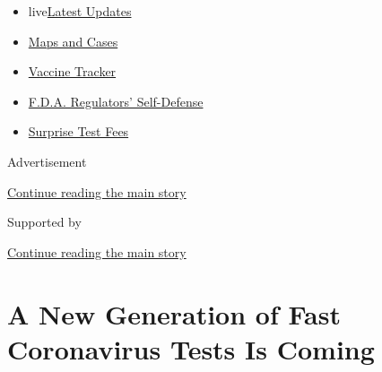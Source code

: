 \begin{itemize}
\tightlist
\item
  live\href{https://www.nytimes3xbfgragh.onion/2020/09/11/world/covid-19-coronavirus.html?name=styln-coronavirus-national\&region=TOP_BANNER\&block=storyline_menu_recirc\&action=click\&pgtype=Article\&impression_id=cadc4580-f4b6-11ea-90f6-17a6587a4d59\&variant=undefined}{Latest
  Updates}
\item
  \href{https://www.nytimes3xbfgragh.onion/interactive/2020/us/coronavirus-us-cases.html?name=styln-coronavirus-national\&region=TOP_BANNER\&block=storyline_menu_recirc\&action=click\&pgtype=Article\&impression_id=cadc4581-f4b6-11ea-90f6-17a6587a4d59\&variant=undefined}{Maps
  and Cases}
\item
  \href{https://www.nytimes3xbfgragh.onion/interactive/2020/science/coronavirus-vaccine-tracker.html?name=styln-coronavirus-national\&region=TOP_BANNER\&block=storyline_menu_recirc\&action=click\&pgtype=Article\&impression_id=cadc4582-f4b6-11ea-90f6-17a6587a4d59\&variant=undefined}{Vaccine
  Tracker}
\item
  \href{https://www.nytimes3xbfgragh.onion/2020/09/10/us/politics/fda-coronavirus-vaccine.html?name=styln-coronavirus-national\&region=TOP_BANNER\&block=storyline_menu_recirc\&action=click\&pgtype=Article\&impression_id=cadc4583-f4b6-11ea-90f6-17a6587a4d59\&variant=undefined}{F.D.A.
  Regulators' Self-Defense}
\item
  \href{https://www.nytimes3xbfgragh.onion/2020/09/09/upshot/coronavirus-surprise-test-fees.html?name=styln-coronavirus-national\&region=TOP_BANNER\&block=storyline_menu_recirc\&action=click\&pgtype=Article\&impression_id=cadc4584-f4b6-11ea-90f6-17a6587a4d59\&variant=undefined}{Surprise
  Test Fees}
\end{itemize}

Advertisement

\protect\hyperlink{after-top}{Continue reading the main story}

Supported by

\protect\hyperlink{after-sponsor}{Continue reading the main story}

\hypertarget{a-new-generation-of-fast-coronavirus-tests-is-coming}{%
\section{A New Generation of Fast Coronavirus Tests Is
Coming}\label{a-new-generation-of-fast-coronavirus-tests-is-coming}}

